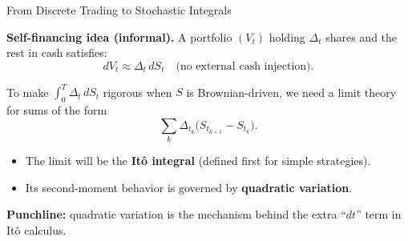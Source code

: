 \documentclass[10pt,aspectratio=169]{beamer}
\begin{document}






\begin{frame}{From Discrete Trading to Stochastic Integrals}

\textbf{Self-financing idea (informal).}\pause\;
A portfolio \((V_t)\) holding \(\Delta_t\) shares and the rest in cash satisfies:\pause
\[
dV_t \approx \Delta_t\, dS_t
\quad\text{(no external cash injection).}
\]\pause

\medskip
To make \(\int_0^T \Delta_t\, dS_t\) rigorous when \(S\) is Brownian-driven,\pause
we need a limit theory for sums of the form\pause
\[
\sum_{k} \Delta_{t_k}\big(S_{t_{k+1}}-S_{t_k}\big).
\]\pause

\medskip
\begin{itemize}
  \item The limit will be the \textbf{It\^o integral} (defined first for simple strategies).\pause
  \item Its second-moment behavior is governed by \textbf{quadratic variation}.\pause
\end{itemize}

\medskip
\textbf{Punchline:}\pause\;
quadratic variation is the mechanism behind the extra ``\(dt\)'' term in It\^o calculus.

\end{frame}

\end{document}
